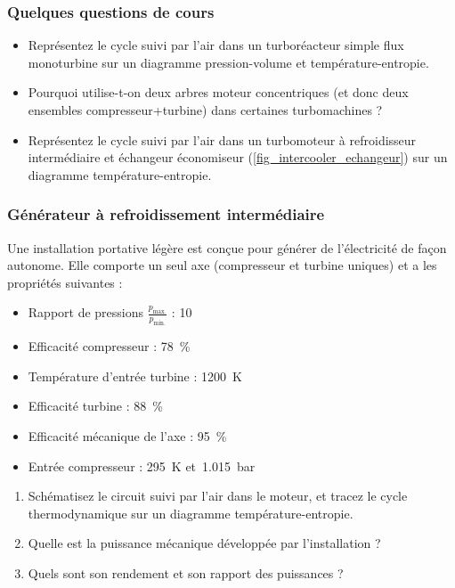 \begin{boiboiboite}
	\propair
	\propgaz
	\isentropiques
\end{boiboiboite}

\subsubsection{Quelques questions de cours}

	\begin{itemize}
		\item Représentez le cycle suivi par l’air dans un turboréacteur simple flux monoturbine sur un diagramme pression-volume et température-entropie.
		\item Pourquoi utilise-t-on deux arbres moteur concentriques (et donc deux ensembles compresseur+turbine) dans certaines turbomachines ?
		\item Représentez le cycle suivi par l’air dans un turbomoteur à refroidisseur intermédiaire et échangeur économiseur (\cref{fig_intercooler_echangeur}) sur un diagramme température-entropie.
	\end{itemize}


\subsubsection{Générateur à refroidissement intermédiaire}

	Une installation portative légère est conçue pour générer de l’électricité de façon autonome. Elle comporte un seul axe (compresseur et turbine uniques) et a les propriétés suivantes :
	\begin{itemize}
		\item Rapport de pressions $\frac{p_\text{max.}}{p_\text{min.}}$ :  	\tab \num{10}
		\item Efficacité compresseur :  									\tab \SI{78}{\percent}
		\item Température d’entrée turbine : 							\tab \SI{1200}{\kelvin}
		\item Efficacité turbine : 										\tab \SI{88}{\percent}
		\item Efficacité mécanique de l’axe : 							\tab \SI{95}{\percent}
		\item Entrée compresseur : 										\tab \SI{295}{\kelvin} et~\SI{1,015}{\bar}
	\end{itemize}

	\begin{enumerate}
		\item Schématisez le circuit suivi par l’air dans le moteur, et tracez le cycle thermodynamique sur un diagramme température-entropie.
		\item Quelle est la puissance mécanique développée par l’installation ?
		\item Quels sont son rendement et son rapport des puissances ?
	\end{enumerate}
	
